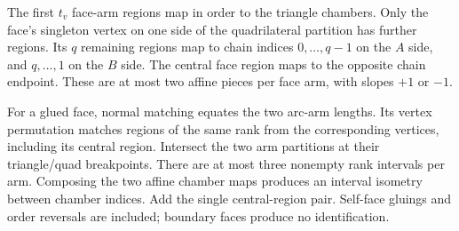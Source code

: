The first $t_v$ face-arm regions map in order to the triangle chambers.
Only the face's singleton vertex on one side of the quadrilateral partition
has further regions. Its $q$ remaining regions map to chain indices
$0,\ldots,q-1$ on the $A$ side, and $q,\ldots,1$ on the $B$ side.
The central face region maps to the opposite chain endpoint. These are
at most two affine pieces per face arm, with slopes $+1$ or $-1$.

For a glued face, normal matching equates the two arc-arm lengths.
Its vertex permutation matches regions of the same rank from the corresponding
vertices, including its central region. Intersect the two arm partitions
at their triangle/quad breakpoints. There are at most three nonempty
rank intervals per arm. Composing the two affine chamber maps produces
an interval isometry between chamber indices. Add the single central-region
pair. Self-face gluings and order reversals are included; boundary faces
produce no identification.

